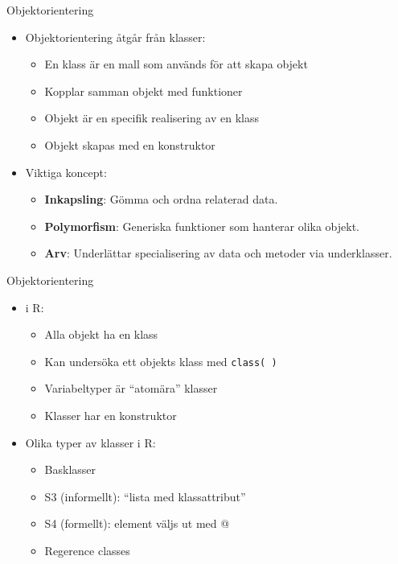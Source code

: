 \documentclass[
  11pt,
  ignorenonframetext,
  handout]{beamer}
\providecommand{\tightlist}{%
  \setlength{\itemsep}{0pt}\setlength{\parskip}{0pt}}
\begin{document}
\begin{frame}{Objektorientering}
\protect\hypertarget{objektorientering}{}
\begin{itemize}
\tightlist
\item
  Objektorientering åtgår från klasser:

  \begin{itemize}
  \tightlist
  \item
    En klass är en mall som används för att skapa objekt
  \item
    Kopplar samman objekt med funktioner
  \item
    Objekt är en specifik realisering av en klass
  \item
    Objekt skapas med en konstruktor
  \end{itemize}
\item
  Viktiga koncept:

  \begin{itemize}
  \tightlist
  \item
    \textbf{Inkapsling}: Gömma och ordna relaterad data.
  \item
    \textbf{Polymorfism}: Generiska funktioner som hanterar olika
    objekt.
  \item
    \textbf{Arv}: Underlättar specialisering av data och metoder via
    underklasser.
  \end{itemize}
\end{itemize}
\end{frame}

\begin{frame}{Objektorientering}
\protect\hypertarget{objektorientering-1}{}
\begin{itemize}
\tightlist
\item
  i R:

  \begin{itemize}
  \tightlist
  \item
    Alla objekt ha en klass
  \item
    Kan undersöka ett objekts klass med \texttt{class( )}
  \item
    Variabeltyper är ``atomära'' klasser
  \item
    Klasser har en konstruktor
  \end{itemize}
\item
  Olika typer av klasser i R:

  \begin{itemize}
  \tightlist
  \item
    Basklasser
  \item
    S3 (informellt): ``lista med klassattribut''
  \item
    S4 (formellt): element väljs ut med @
  \item
    Regerence classes
  \end{itemize}
\end{itemize}
\end{frame}
\end{document}
